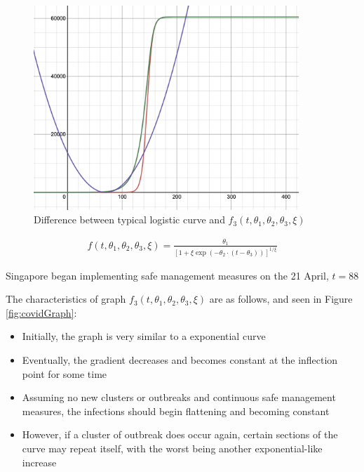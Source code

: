 \documentclass[a4paper,titlepage]{article}
\begin{document}
\begin{figure}[htbp]
    \centering
    \includegraphics[width=10cm]{covidVsBasicLogistic.png}
    \caption{Difference between typical logistic curve and $f_3(t,\theta_1,\theta_2,\theta_3,\xi)$}
    \label{fig:covidVsBasicLogistic}
\end{figure}

\begin{align}
    f(t,\theta_1,\theta_2,\theta_3,\xi)={\frac {\theta _{1}}{[1+\xi \exp(-\theta _{2}\cdot (t-\theta _{3}))]^{1/\xi }}}
\end{align}

Singapore began implementing safe management measures on the 21 April, $t=88$

The characteristics of graph $f_3(t,\theta_1,\theta_2,\theta_3,\xi)$ are as follows, and seen in Figure \ref{fig:covidGraph}:

\begin{itemize}
    \item Initially, the graph is very similar to a exponential curve
    \item Eventually, the gradient decreases and becomes constant at the inflection point for some time
    \item Assuming no new clusters or outbreaks and continuous safe management measures, the infections should begin flattening and becoming constant
    \item However, if a cluster of outbreak does occur again, certain sections of the curve may repeat itself, with the worst being another exponential-like increase
\end{itemize}
\end{document}
